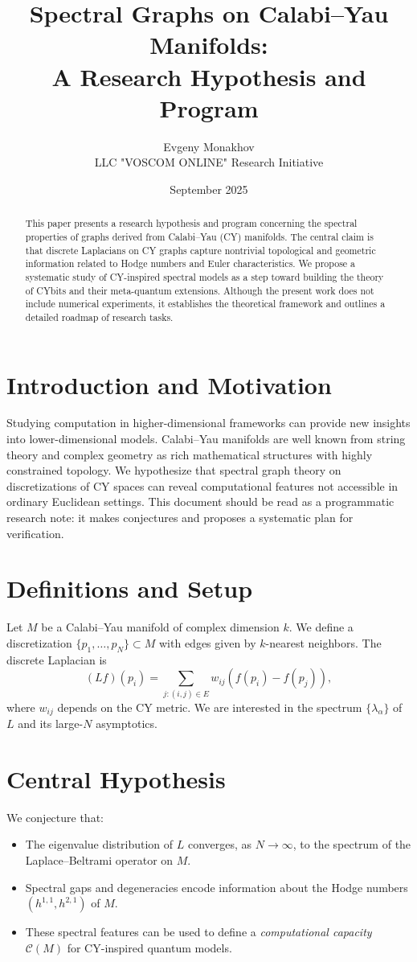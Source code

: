 \documentclass[12pt,a4paper]{article}
\title{Spectral Graphs on Calabi--Yau Manifolds: \\
A Research Hypothesis and Program}
\author{Evgeny Monakhov \\ LLC "VOSCOM ONLINE" Research Initiative}
\date{September 2025}
\begin{document}
\maketitle

\begin{abstract}
This paper presents a research hypothesis and program concerning 
the spectral properties of graphs derived from Calabi--Yau (CY) manifolds. 
The central claim is that discrete Laplacians on CY graphs capture 
nontrivial topological and geometric information 
related to Hodge numbers and Euler characteristics. 
We propose a systematic study of CY-inspired spectral models 
as a step toward building the theory of CYbits and 
their meta-quantum extensions. 
Although the present work does not include numerical experiments, 
it establishes the theoretical framework and outlines 
a detailed roadmap of research tasks.
\end{abstract}

\section{Introduction and Motivation}
Studying computation in higher-dimensional frameworks 
can provide new insights into lower-dimensional models. 
Calabi--Yau manifolds are well known from string theory 
and complex geometry as rich mathematical structures 
with highly constrained topology. 
We hypothesize that spectral graph theory on discretizations of CY spaces 
can reveal computational features not accessible in ordinary Euclidean settings.
This document should be read as a programmatic research note: 
it makes conjectures and proposes a systematic plan for verification.

\section{Definitions and Setup}
Let $M$ be a Calabi--Yau manifold of complex dimension $k$.  
We define a discretization $\{p_1,\dots,p_N\}\subset M$ 
with edges given by $k$-nearest neighbors.  
The discrete Laplacian is
\[
(Lf)(p_i) = \sum_{j:(i,j)\in E} w_{ij}(f(p_i)-f(p_j)),
\]
where $w_{ij}$ depends on the CY metric.
We are interested in the spectrum $\{\lambda_\alpha\}$ of $L$ 
and its large-$N$ asymptotics.

\section{Central Hypothesis}
We conjecture that:
\begin{itemize}
\item The eigenvalue distribution of $L$ converges, as $N\to\infty$, 
to the spectrum of the Laplace--Beltrami operator on $M$.  
\item Spectral gaps and degeneracies encode information about 
the Hodge numbers $(h^{1,1}, h^{2,1})$ of $M$.  
\item These spectral features can be used to define 
a \emph{computational capacity} $\mathcal{C}(M)$ 
for CY-inspired quantum models.  
\end{itemize}
\end{document}
